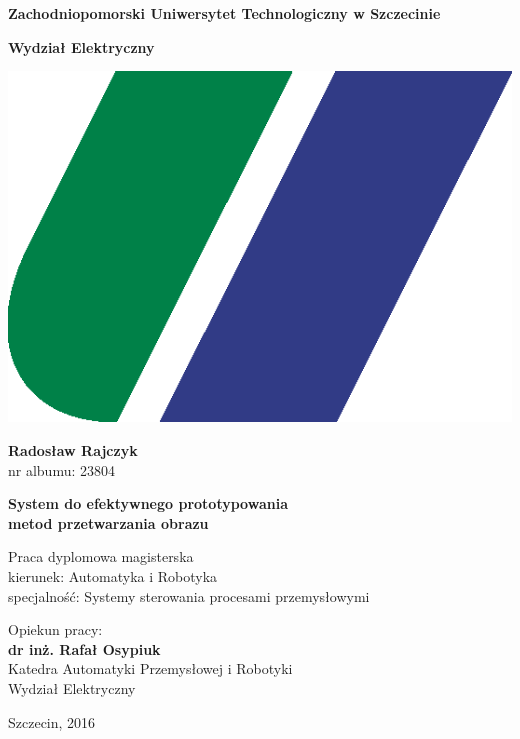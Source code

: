 \documentclass[document.tex]{subfiles}
\begin{document}
\begin{center}
\huge{\textbf{Zachodniopomorski Uniwersytet Technologiczny w Szczecinie}}

\LARGE{\textbf{Wydział Elektryczny}}

\vspace{0.5cm}
\includegraphics[scale=0.2]{imgs/logoNew.png}

\vspace{1cm}
\Large{\textbf{Radosław Rajczyk}} \\
\large{nr albumu: 23804}

\vspace{1cm}
\Large{\textbf{System do efektywnego prototypowania \\
metod przetwarzania obrazu}}

\vspace{1cm}
\large{Praca dyplomowa magisterska \\
kierunek: Automatyka i Robotyka \\
specjalność: Systemy sterowania procesami przemysłowymi}
\end{center}

\vspace{4cm}
\begin{flushright}
\large{Opiekun pracy:\\
\textbf{dr inż. Rafał Osypiuk} \\
Katedra Automatyki Przemysłowej i Robotyki\\
Wydział Elektryczny}
\end{flushright}

\vspace{2cm}
\begin{center}
\Large{Szczecin, 2016}
\end{center}
\end{document}
